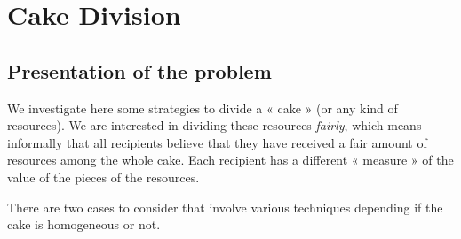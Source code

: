 
\chapter{Cake Division}
\label{Appendix:CakeDivision}

\section{Presentation of the problem}

We investigate here some strategies to divide a « cake »
(or any kind of resources). We are interested in dividing these resources \textit{fairly}, 
which means informally that all recipients believe that they have received a fair amount of resources among the whole cake. 
Each recipient has a different « measure » of the value of the pieces of the resources. 

There are two cases to consider that involve various techniques depending if the cake is homogeneous or not. 

